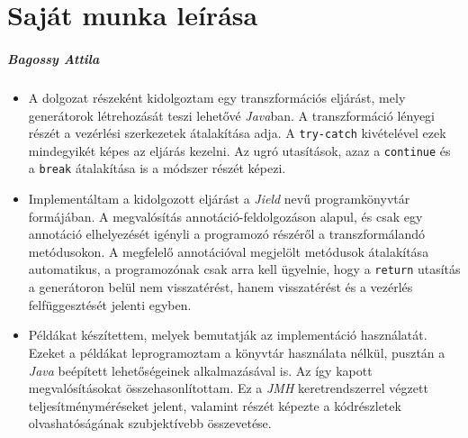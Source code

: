\chapter*{Saját munka leírása}

\if{}
    \paragraph{Bagossy Attila}
\fi

\begin{itemize}
    \item A dolgozat részeként kidolgoztam egy transzformációs eljárást, mely generátorok létrehozását teszi lehetővé \textit{Java}ban. A transzformáció lényegi részét a vezérlési szerkezetek átalakítása adja. A \texttt{try-catch} kivételével ezek mindegyikét képes az eljárás kezelni. Az ugró utasítások, azaz a \texttt{continue} és a \texttt{break} átalakítása is a módszer részét képezi.
    \item Implementáltam a kidolgozott eljárást a \textit{Jield} nevű programkönyvtár formájában. A megvalósítás annotáció-feldolgozáson alapul, és csak egy annotáció elhelyezését igényli a programozó részéről a transzformálandó metódusokon. A megfelelő annotációval megjelölt metódusok átalakítása automatikus, a programozónak csak arra kell ügyelnie, hogy a \texttt{return} utasítás a generátoron belül nem visszatérést, hanem visszatérést és a vezérlés felfüggesztését jelenti egyben.
    \item Példákat készítettem, melyek bemutatják az implementáció használatát. Ezeket a példákat leprogramoztam a könyvtár használata nélkül, pusztán a \textit{Java} beépített lehetőségeinek alkalmazásával is. Az így kapott megvalósításokat összehasonlítottam. Ez a \textit{JMH} keretrendszerrel végzett teljesítményméréseket jelent, valamint részét képezte a kódrészletek olvashatóságának szubjektívebb összevetése.
\end{itemize}